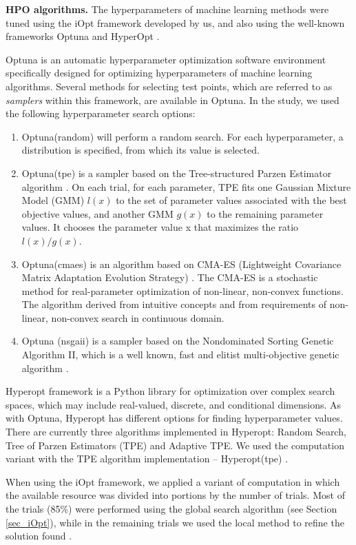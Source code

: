 \documentclass[preprint,12pt]{elsarticle}
\begin{document}
\textbf{HPO algorithms.} The hyperparameters of machine learning methods were tuned using the iOpt framework developed by us, and also using the well-known frameworks Optuna \cite{optuna} and HyperOpt \cite{hyperopt}.

Optuna is an automatic hyperparameter optimization software environment specifically designed for optimizing hyperparameters of machine learning algorithms. Several methods for selecting test points, which are referred to as \textit{samplers} within this framework, are available in Optuna.  In the study, we used the following hyperparameter search options:
\begin{enumerate}
	\item Optuna(random) will perform a random search. For each hyperparameter, a distribution is specified, from which its value is selected.
	\item Optuna(tpe) is a sampler based on the Tree-structured Parzen Estimator algorithm \cite{NIPS2011_86e8f7ab}. On each trial, for each parameter, TPE fits one Gaussian Mixture Model (GMM) $l(x)$ to the set of parameter values associated with the best objective values, and another GMM $g(x)$ to the remaining parameter values. It chooses the parameter value x that maximizes the ratio $l(x)/g(x)$.
	\item Optuna(cmaes) is an algorithm based on CMA-ES (Lightweight Covariance Matrix Adaptation Evolution Strategy) \cite{cmaes2015}. The CMA-ES is a stochastic method for real-parameter optimization of non-linear, non-convex functions. The algorithm derived from intuitive concepts and from requirements of non-linear, non-convex search in continuous domain.
	\item Optuna (nsgaii) is a sampler based on the Nondominated Sorting Genetic Algorithm II,  which is a well known, fast and elitist multi-objective genetic algorithm \cite{nsgaii2013}.

\end{enumerate}


Hyperopt framework is a Python library for optimization over complex search spaces, which may include real-valued, discrete, and conditional dimensions. As with Optuna, Hyperopt has different options for finding hyperparameter values. There are currently three algorithms implemented in Hyperopt: Random Search, Tree of Parzen Estimators (TPE) and Adaptive TPE. We used the computation variant with the TPE algorithm implementation -- Hyperopt(tpe) \cite{NIPS2011_86e8f7ab}.

When using the iOpt framework, we applied a variant of computation in which the available resource was divided into portions by the number of trials. Most of the trials (85\%) were performed using the global search algorithm (see Section \ref{sec_iOpt}), while in the remaining trials we used the local method to refine the solution found \cite{Kelley}.
\end{document}
